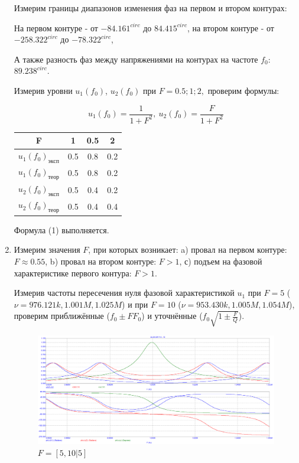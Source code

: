 \documentclass[a4paper, 12pt]{article}%
\begin{document}
\begin{enumerate}
Измерим границы диапазонов изменения фаз на первом и втором контурах:

На первом контуре - от  $-84.161^{circ}$ до $84.415^{circ}$, на втором контуре - от $-258.322^{circ}$ до $-78.322^{circ}$,

А также разность фаз между напряжениями на контурах на частоте $f_0:$ $89.238^{circ}$.

Измерив уровни $u_1(f_0)$, $u_2(f_0)$ при $F = 0.5; 1; 2,$ проверим формулы:

\begin{equation}
u_1(f_0) = \frac{1}{1 + F^2}, \: u_2(f_0) = \frac{F}{1 + F^2}
\end{equation}

\begin{center}
\begin{tabular}{|c|c|c|c|}
\hline 
F & 1 & 0.5 & 2 \\ 
\hline 
$u_1(f_0)_{\text{эксп}}$ & 0.5 & 0.8 & 0.2 \\ 
\hline 
$u_1(f_0)_{\text{теор}}$ & 0.5 & 0.8 & 0.2 \\ 
\hline 
$u_2(f_0)_{\text{эксп}}$ & 0.5 & 0.4 & 0.2 \\ 
\hline 
$u_2(f_0)_{\text{теор}}$ & 0.5 & 0.4 & 0.4 \\ 
\hline 
\end{tabular}
\end{center}

Формула (1) выполняется.

\item Измерим значения $F$, при которых возникает: a) провал на первом контуре: $F \approx 0.55$, b) провал на втором контуре: $F > 1$, с) подъем на фазовой характеристике первого контура: $F > 1$.

Измерив частоты пересечения нуля фазовой характеристикой $u_1$ при $F = 5$ ($\nu = 976.121k, 1.001M, 1.025M$) и при $F = 10$ ($\nu = 953.430k, 1.005M, 1.054M$), проверим приближённые ($f_0 \pm FF_0$) и уточнённые ($f_0\sqrt{1 \pm \frac{F}{Q}}$).

\begin{figure}[h!]
\centering
\includegraphics[scale = 0.4]{images/plot4_1.png}
\caption{$F = [5, 10 | 5]$}
\label{fig:Image1}
\end{figure}


\end{enumerate}
\end{document}
